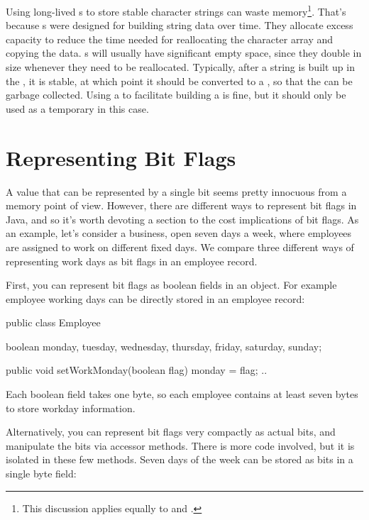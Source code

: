 Using long-lived s to store stable character strings 
can waste memory\footnote{This discussion
applies equally to  and .}. That's
because s were designed for building string data over time. They
allocate excess capacity to reduce the time needed for reallocating the
character array and copying the data.  s will usually
have significant empty space, since they double in size whenever they need to be reallocated. 
Typically, after a string is built up in the , it is stable, at which point
it should be converted to a , so that the  can be
garbage collected. Using a  to facilitate
building a  is fine, but it should only be used as a temporary
in this case.

\section{Representing Bit Flags}
\label{sec:bit-flags}

A value that can be represented by a single bit seems pretty innocuous from a
memory point of view. However, there are different ways to represent bit flags
in Java, and so it's worth devoting a section to the cost implications of
bit flags. As an example, let's consider a business, open seven days a
week, where employees are assigned to work on different fixed days.  We compare three
different ways of representing work days as bit flags in an employee record.
 
First, you can represent bit flags as boolean fields in an object. For example
employee working days can be directly stored in an employee record:
\begin{shortlisting}

    public class Employee {
    	boolean monday, tuesday, wednesday, thursday, friday, saturday, sunday;
    	
    	public void setWorkMonday(boolean flag) {
    		monday = flag;
    	}
    	..
    }
    
\end{shortlisting}
Each boolean field takes one byte, so each employee contains at least seven
bytes to store workday information. 

Alternatively, you can represent bit flags very compactly as actual bits, and
manipulate the bits via accessor methods. There is more code involved,
but it is isolated in these few methods. Seven days of the week can be stored as
bits in a single byte field:

